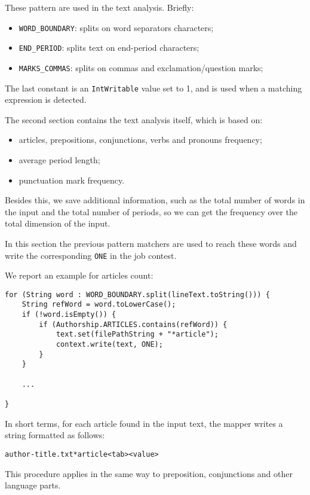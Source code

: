 \documentclass[a4paper,11pt, twoside]{article}
\begin{document}
		\noindent
		These pattern are used in the text analysis. Briefly: \begin{itemize}
			\item \lstinline|WORD_BOUNDARY|: splits on word separators characters;
			\item \lstinline|END_PERIOD|: splits text on end-period characters;
			\item \lstinline|MARKS_COMMAS|: splits on commas and exclamation/question marks;
		\end{itemize}

	\noindent
	The last constant is an \lstinline|IntWritable| value set to 1, and is used when a matching expression is detected.

	\noindent
	The second section contains the text analysis itself, which is based on: \begin{itemize}
		\item articles, prepositions, conjunctions, verbs and pronouns frequency;
		\item average period length;
		\item punctuation mark frequency.
	\end{itemize}
	Besides this, we save additional information, such as the total number of words in the input and the total number of periods, so we can get the frequency over the total dimension of the input.

	In this section the previous pattern matchers are used to reach these words and write the corresponding \lstinline|ONE| in the job contest. 
	
	We report an example for articles count: \begin{lstlisting}[firstnumber=85, caption={Articles counting in Map method}, captionpos=b]
for (String word : WORD_BOUNDARY.split(lineText.toString())) {
	String refWord = word.toLowerCase();
	if (!word.isEmpty()) {
		if (Authorship.ARTICLES.contains(refWord)) {
			text.set(filePathString + "*article");
			context.write(text, ONE);
		}
	}

	...

}
	\end{lstlisting}
	
	In short terms, for each article found in the input text, the mapper writes a string formatted as follows:\begin{center}
		\texttt{author-title.txt*article<tab><value>} 
	\end{center}

	This procedure applies in the same way to preposition, conjunctions and other language parts.
	
\end{document}
